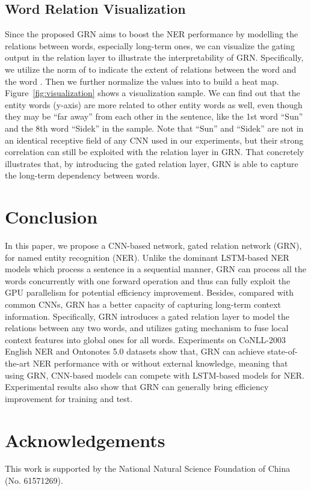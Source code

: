\documentclass[letterpaper]{article} \usepackage{aaai19}  \usepackage{times}  \usepackage{helvet}  \usepackage{courier}  \usepackage{url}  \usepackage{graphicx}  \usepackage{amsmath}
\newcommand{\ie}{\text{i.e.,}}
\newcommand{\GRN}{GRN}
\begin{document}
\subsection{Word Relation Visualization}
Since the proposed \GRN{} aims to boost the NER performance by modelling the relations between words, especially long-term ones, we can visualize the gating output in the relation layer to illustrate the interpretability of \GRN{}. Specifically, we utilize the  norm of  to indicate the extent of relations between the word  and the word . Then we further normalize the values into  to build a heat map. Figure~\ref{fig:visualization} shows a visualization sample. We can find out that the entity words (y-axis) are more related to other entity words as well, even though they may be ``far away'' from each other in the sentence, like the 1st word ``Sun'' and the 8th word ``Sidek'' in the sample. Note that ``Sun'' and ``Sidek'' are not in an identical receptive field of any CNN used in our experiments, but their strong correlation can still be exploited with the relation layer in \GRN{}. That concretely illustrates that, by introducing the gated relation layer, \GRN{} is able to capture the long-term dependency between words. 



\section{Conclusion}
In this paper, we propose a CNN-based network, \ie{} gated relation network (\GRN{}), for named entity recognition (NER). Unlike the dominant LSTM-based NER models which process a sentence in a sequential manner, \GRN{} can process all the words concurrently with one forward operation and thus can fully exploit the GPU parallelism for potential efficiency improvement. Besides, compared with common CNNs, \GRN{} has a better capacity of capturing long-term context information. Specifically, \GRN{} introduces a gated relation layer to model the relations between any two words, and utilizes gating mechanism to fuse local context features into global ones for all words. Experiments on CoNLL-2003 English NER and Ontonotes 5.0 datasets show that, \GRN{} can achieve state-of-the-art NER performance with or without external knowledge, meaning that using \GRN{}, CNN-based models can compete with LSTM-based models for NER. Experimental results also show that \GRN{} can generally bring efficiency improvement for training and test.

\section{Acknowledgements}
This work is supported by the National Natural Science Foundation of China (No. 61571269).



\end{document}
